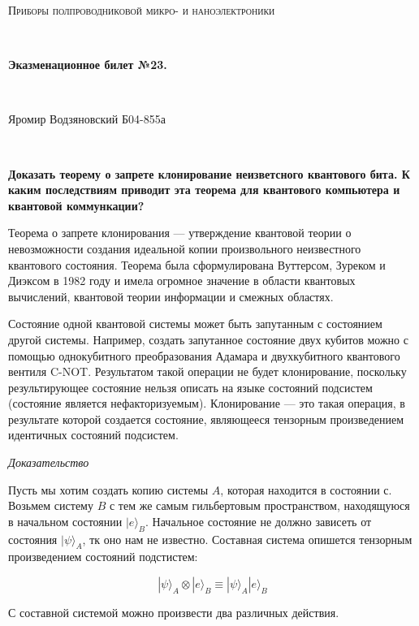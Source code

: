 \documentclass[a4paper]{article}
\begin{document}
\graphicspath{ {pictures/} }
\begin{center}
    {\scshape\Large Приборы полпроводниковой микро- и наноэлектроники} \par

    \

    {\huge\bfseries Эказменационное билет №23.} \par 

    \

    {\large Яромир Водзяновский Б04-855а}
\end{center}

\

\textbf{Доказать теорему о запрете клонирование неизветсного квантового бита. К каким последствиям приводит эта теорема для квантового компьютера и квантовой коммункации?}


Теорема о запрете клонирования — утверждение квантовой теории о невозможности создания идеальной копии произвольного неизвестного квантового состояния. 
Теорема была сформулирована Вуттерсом, Зуреком и Диэксом в 1982 году и имела огромное значение в области квантовых вычислений, квантовой теории информации и смежных областях.

Состояние одной квантовой системы может быть запутанным с состоянием другой системы. Например, создать запутанное состояние двух кубитов можно с помощью 
однокубитного преобразования Адамара и двухкубитного квантового вентиля C-NOT. Результатом такой операции не будет клонирование, поскольку результирующее 
состояние нельзя описать на языке состояний подсистем (состояние является нефакторизуемым). Клонирование — это такая операция, в результате которой создается 
состояние, являющееся тензорным произведением идентичных состояний подсистем.



\textit{Доказательство}

Пусть мы хотим создать копию системы $A$, которая находится в состоянии с. Возьмем систему $B$ с тем же самым гильбертовым пространством, 
находящуюся в начальном состоянии $|e \rangle_B$. Начальное состояние не должно зависеть от состояния $|\psi\rangle_A$, тк оно нам не известно. 
Составная система опишется тензорным произведением состояний подстистем:

\begin{equation}
    | \psi \rangle_A \otimes |e \rangle_B \equiv  | \psi \rangle_A  |e \rangle_B
\end{equation}

С составной системой можно произвести два различных действия.
\end{document}
